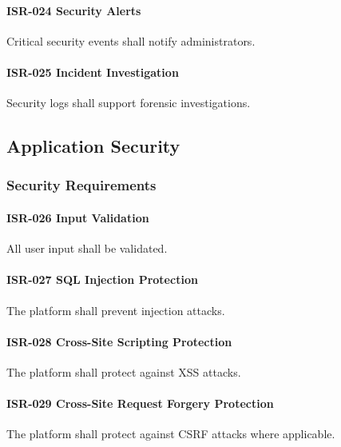 \paragraph{ISR-024 Security Alerts}

Critical security events shall notify administrators.

\paragraph{ISR-025 Incident Investigation}

Security logs shall support forensic investigations.


\subsection{Application Security}

\subsubsection*{Security Requirements}

\paragraph{ISR-026 Input Validation}

All user input shall be validated.

\paragraph{ISR-027 SQL Injection Protection}

The platform shall prevent injection attacks.

\paragraph{ISR-028 Cross-Site Scripting Protection}

The platform shall protect against XSS attacks.

\paragraph{ISR-029 Cross-Site Request Forgery Protection}

The platform shall protect against CSRF attacks where applicable.

